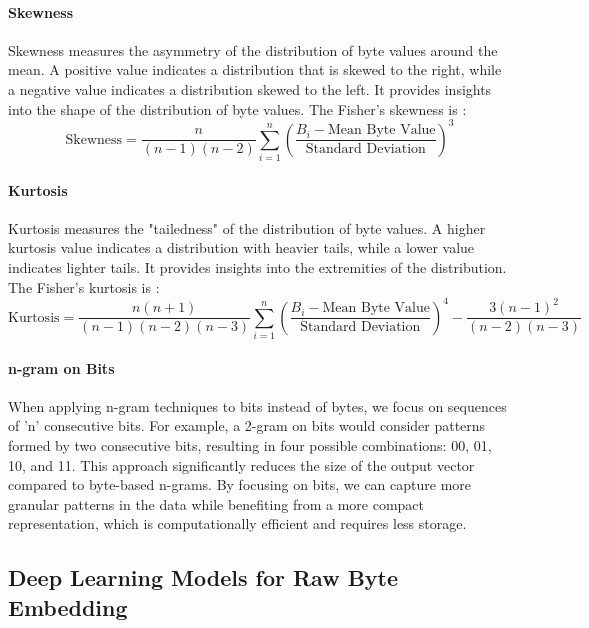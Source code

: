         \paragraph{Skewness}Skewness\cite{wheeler_problems_2011} measures the asymmetry of the distribution of byte values around the mean. A positive value indicates a distribution that is skewed to the right, while a negative value indicates a distribution skewed to the left. It provides insights into the shape of the distribution of byte values. The Fisher’s skewness\cite{cain_univariate_2017} is :
        \begin{equation}
        \text{Skewness} = \frac{n}{(n-1)(n-2)} \sum_{i=1}^{n} \left( \frac{B_i - \text{Mean Byte Value}}{\text{Standard Deviation}} \right)^3
        \label{eq:skewness}
        \end{equation}

        \paragraph{Kurtosis}Kurtosis\cite{wheeler_problems_2011} measures the "tailedness" of the distribution of byte values. A higher kurtosis value indicates a distribution with heavier tails, while a lower value indicates lighter tails. It provides insights into the extremities of the distribution. The Fisher’s kurtosis\cite{cain_univariate_2017} is :
        \begin{equation}
        \text{Kurtosis} = \frac{n(n+1)}{(n-1)(n-2)(n-3)} \sum_{i=1}^{n} \left( \frac{B_i - \text{Mean Byte Value}}{\text{Standard Deviation}} \right)^4 - \frac{3(n-1)^2}{(n-2)(n-3)}
        \label{eq:kurtosis}
        \end{equation}

        \paragraph{n-gram on Bits}When applying n-gram techniques to bits instead of bytes, we focus on sequences of 'n' consecutive bits. For example, a 2-gram on bits would consider patterns formed by two consecutive bits, resulting in four possible combinations: 00, 01, 10, and 11. This approach significantly reduces the size of the output vector compared to byte-based n-grams. By focusing on bits, we can capture more granular patterns in the data while benefiting from a more compact representation, which is computationally efficient and requires less storage.

\subsection{Deep Learning Models for Raw Byte Embedding}\label{seq:background:deep_learning_models_for_raw_byte_embedding}


